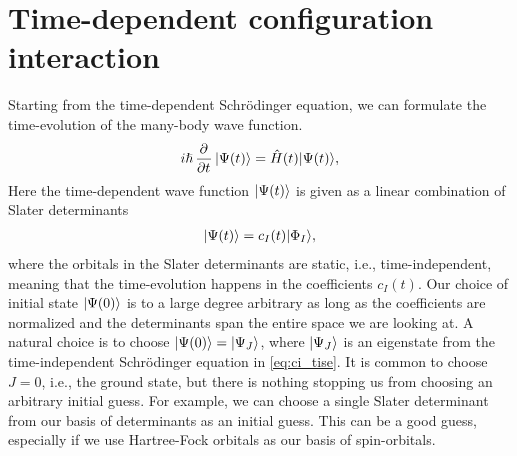     \section{Time-dependent configuration interaction}
        Starting from the time-dependent Schrödinger equation, we can formulate
        the time-evolution of the many-body wave function.
        \begin{align}
            i\hslash \dpd[]{}{t}\ket{\Psi(t)}
            = \hamil(t)\ket{\Psi(t)},
            \label{eq:ci_tdse}
        \end{align}
        Here the time-dependent wave function $| \Psi(t) \rangle$ is given as a
        linear combination of Slater determinants
        \begin{align}
            | \Psi(t) \rangle = c_{I}(t) | \Phi_I \rangle,
            \label{eq:ci_td_wave}
        \end{align}
        where the orbitals in the Slater determinants are static, i.e.,
        time-independent, meaning that the time-evolution happens in the
        coefficients $c_{I}(t)$.
        Our choice of initial state $| \Psi(0) \rangle$ is to a large degree
        arbitrary as long as the coefficients are normalized and the
        determinants span the entire space we are looking at.
        A natural choice is to choose $| \Psi(0) \rangle = | \Psi_J \rangle$, where
        $| \Psi_J \rangle$ is an eigenstate from the time-independent Schrödinger
        equation in \autoref{eq:ci_tise}.
        It is common to choose $J = 0$, i.e., the ground state, but there is
        nothing stopping us from choosing an arbitrary initial guess.
        For example, we can choose a single Slater determinant from our basis of
        determinants as an initial guess.
        This can be a good guess, especially if we use Hartree-Fock orbitals as
        our basis of spin-orbitals.

